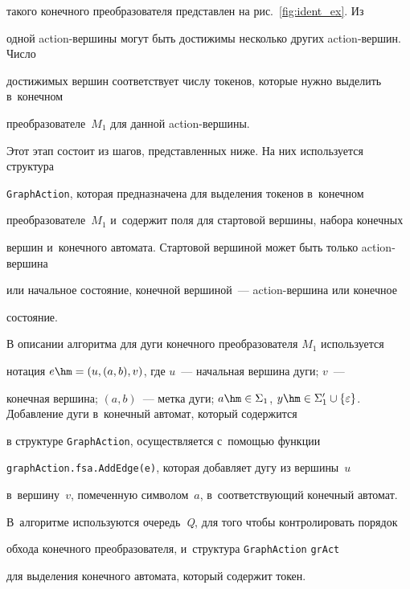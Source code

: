 такого конечного преобразователя представлен на рис.~\ref{fig:ident_ex}. Из 


одной action-вер\-ши\-ны могут быть достижимы несколько других action-вер\-шин. Чис\-ло 


достижимых вершин соответствует числу токенов, которые нужно выделить в~конечном 


преобразователе~$M_1$ для данной action-вер\-шины.











Этот этап состоит из шагов, представленных ниже. На них используется структура 


\verb"GraphAction", которая предназначена для выделения токенов в~конечном 


преобразователе~$M_1$ и~содержит поля для стартовой вершины, набора конечных 


вершин и~конечного автомата. Стартовой вершиной может быть только action-вер\-ши\-на 


или начальное состояние, конечной вершиной~--- action-вер\-ши\-на или конечное 


состояние.





В описании алгоритма для дуги конечного преобразователя $M_1$ используется 


нотация $e \hm= (u, (a, b), v)$, где $u$~--- начальная вершина дуги; $v$~--- 


конечная вершина; $(a, b)$~--- метка дуги; $a \hm \in \Sigma_1$, $y \hm\in \Sigma'_1 


\cup \{\varepsilon \}$.  Добавление дуги в~конечный автомат, который содержится 


в структуре \verb"GraphAction", осуществляется с~помощью функции 


\verb"graphAction.fsa.AddEdge(e)", которая добавляет дугу из вершины~$u$ 


в~вершину~$v$, помеченную символом~$a$, в~соответствующий конечный автомат. 


В~алгоритме используются очередь~\textit{Q}, для того чтобы контролировать порядок 


обхода конечного преобразователя, и~структура \verb"GraphAction" \verb"grAct" 


для выделения конечного автомата, который содержит токен.





